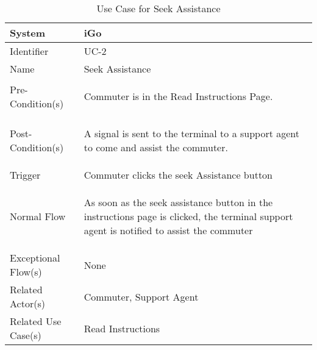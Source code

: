 \begin{table}[ht]
    \centering
    \begin{tabular}{|l|p{11cm}|}
         \hline
         System             & iGo\\
         \hline
         Identifier         & UC-2 \\
         \hline
         Name               & Seek Assistance \\
         \hline
         Pre-Condition(s)   & 
         \begin{enumerate*}[itemjoin=\newline]
             \item Commuter is in the Read Instructions Page.
         \end{enumerate*} \\
         \hline
         Post-Condition(s)  & 
         \begin{enumerate*}[itemjoin=\newline]
             \item A signal is sent to the terminal to a support agent to come and assist the commuter.
         \end{enumerate*} \\
         \hline
         Trigger            & Commuter clicks the seek Assistance button \\
         \hline
         Normal Flow        & 
         \begin{enumerate*}[itemjoin=\newline]
             \item As soon as the seek assistance button in the instructions page is clicked, the terminal support agent is notified to assist the commuter
         \end{enumerate*} \\
         \hline
         Exceptional Flow(s)& None\\
         \hline
         Related Actor(s)   & Commuter, Support Agent \\
         \hline
         Related Use Case(s)& Read Instructions\\
         \hline
    \end{tabular}
    \caption{Use Case for Seek Assistance}
    \label{tab:UC_SeekAssistance}
\end{table}

